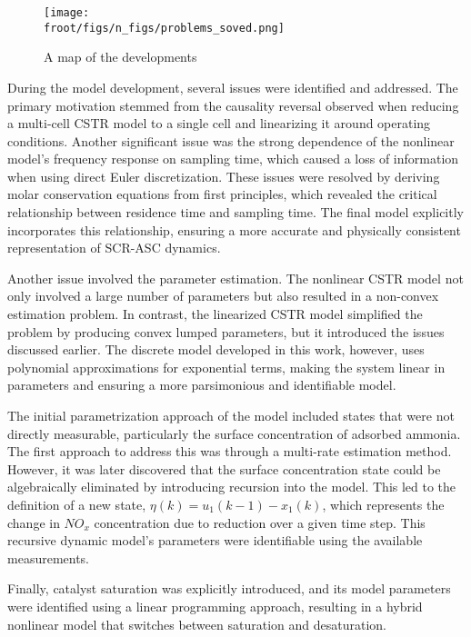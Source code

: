 \begin{figure}[H]
        \centering
        \texttt{[image: \\froot/figs/n\_figs/problems\_soved.png]}
        \caption{A map of the developments}
\end{figure}

During the model development, several issues were identified and addressed. The primary motivation stemmed from the
causality reversal observed when reducing a multi-cell CSTR model to a single cell and linearizing it around operating
conditions. Another significant issue was the strong dependence of the nonlinear model's frequency response on sampling
time, which caused a loss of information when using direct Euler discretization. These issues were resolved by deriving
molar conservation equations from first principles, which revealed the critical relationship between residence time and
sampling time. The final model explicitly incorporates this relationship, ensuring a more accurate and physically
consistent representation of SCR-ASC dynamics.

Another issue involved the parameter estimation. The nonlinear CSTR model not only involved a large number of parameters
but also resulted in a non-convex estimation problem. In contrast, the linearized CSTR model simplified the problem by
producing convex lumped parameters, but it introduced the issues discussed earlier. The discrete model developed in this
work, however, uses polynomial approximations for exponential terms, making the system linear in parameters and ensuring
a more parsimonious and identifiable model.

The initial parametrization approach of the model included states that were not directly measurable, particularly the
surface concentration of adsorbed ammonia. The first approach to address this was through a multi-rate estimation
method. However, it was later discovered that the surface concentration state could be algebraically eliminated by
introducing recursion into the model. This led to the definition of a new state, $\eta(k) = u_1(k-1) - x_1(k)$, which
represents the change in $NO_x$ concentration due to reduction over a given time step. This recursive dynamic model’s
parameters were identifiable using the available measurements.

Finally, catalyst saturation was explicitly introduced, and its model parameters were identified using a linear
programming approach, resulting in a hybrid nonlinear model that switches between saturation and desaturation.
